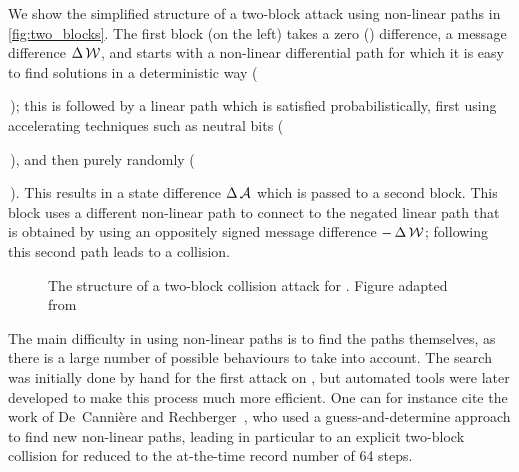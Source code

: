 We show the simplified structure of a two-block attack using non-linear paths in \autoref{fig:two_blocks}. The first block (on the left) takes a zero () \iv difference,
a message difference $\operatorname{\Delta}\mathcal{W}$, and starts with a non-linear differential path  for which it is easy to find solutions in a deterministic way
(\,\,); this is
followed by a linear path  which is satisfied probabilistically, first using accelerating techniques such as neutral bits (\,\,),
and then purely randomly (\,\,). This results in a state difference $\operatorname{\Delta}\mathcal{A}$ which is passed to a second block. This block
uses a different non-linear path  to connect to the negated linear path  that is obtained by using an oppositely signed message difference $-\operatorname{\Delta}\mathcal{W}$; following this second path leads to
a collision.

\begin{figure}[!htb]
\begin{centering}

\caption[The structure of a two-block collision attack for \sha.]{The structure of a two-block collision attack for \sha. Figure adapted from~\cite{TiKZ:Cryptographers}\label{fig:two_blocks}}
\end{centering}
\end{figure}

\medskip

The main difficulty in using non-linear paths is to find the paths themselves, as there is a large number of possible behaviours to take into account.
The search was initially done by hand for the first attack on \shaone, but automated tools were later developed to make this process much
more efficient. One can for instance cite the work of De~Cannière and Rechberger~\cite{DBLP:conf/asiacrypt/CanniereR06}, who used a guess-and-determine
approach to find new non-linear paths, leading in particular to an explicit two-block collision for \shaone reduced to the at-the-time record number of 64 steps.

